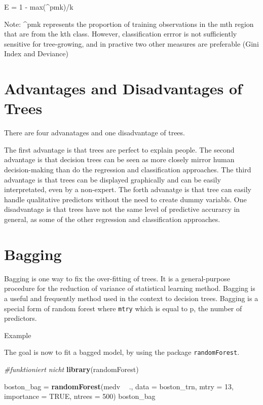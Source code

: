 \documentclass[]{report}
\newenvironment{Shaded}{\begin{snugshade}}{\end{snugshade}}
\newcommand{\KeywordTok}[1]{\textcolor[rgb]{0.13,0.29,0.53}{\textbf{#1}}}
\newcommand{\DataTypeTok}[1]{\textcolor[rgb]{0.13,0.29,0.53}{#1}}
\newcommand{\DecValTok}[1]{\textcolor[rgb]{0.00,0.00,0.81}{#1}}
\newcommand{\StringTok}[1]{\textcolor[rgb]{0.31,0.60,0.02}{#1}}
\newcommand{\CommentTok}[1]{\textcolor[rgb]{0.56,0.35,0.01}{\textit{#1}}}
\newcommand{\OtherTok}[1]{\textcolor[rgb]{0.56,0.35,0.01}{#1}}
\newcommand{\OperatorTok}[1]{\textcolor[rgb]{0.81,0.36,0.00}{\textbf{#1}}}
\newcommand{\NormalTok}[1]{#1}
\begin{document}
E = 1 - max(\^{}pmk)/k

Note: \^{}pmk represents the proportion of training observations in the
mth region that are from the kth class. However, classification errror
is not sufficiently sensitive for tree-growing, and in practive two
other measures are preferable (Gini Index and Deviance)

\section{Advantages and Disadvantages of
Trees}\label{advantages-and-disadvantages-of-trees}

There are four advanatages and one disadvantage of trees.

The first advantage is that trees are perfect to explain people. The
second advantage is that decision trees can be seen as more closely
mirror human decision-making than do the regression and classification
approaches. The third advantage is that trees can be displayed
graphically and can be easily interpretated, even by a non-expert. The
forth advanatge is that tree can easily handle qualitative predictors
without the need to create dummy variabls. One disadvantage is that
trees have not the same level of predictive accurarcy in general, as
some of the other regression and classification approaches.

\section{Bagging}\label{bagging}

Bagging is one way to fix the over-fitting of trees. It is a
general-purpose procedure for the reduction of variance of statistical
learning method. Bagging is a useful and frequently method used in the
context to decision trees. Bagging is a special form of random forest
where \texttt{mtry} which is equal to p, the number of predictors.

Example

The goal is now to fit a bagged model, by using the package
\texttt{randomForest}.

\begin{Shaded}
\begin{Highlighting}[]
\CommentTok{#funktioniert nicht}
\KeywordTok{library}\NormalTok{(randomForest)}

\NormalTok{boston_bag =}\StringTok{ }\KeywordTok{randomForest}\NormalTok{(medv }\OperatorTok{~}\StringTok{ }\NormalTok{., }\DataTypeTok{data =}\NormalTok{ boston_trn, }\DataTypeTok{mtry =} \DecValTok{13}\NormalTok{, }
                          \DataTypeTok{importance =} \OtherTok{TRUE}\NormalTok{, }\DataTypeTok{ntrees =} \DecValTok{500}\NormalTok{)}
\NormalTok{boston_bag}
\end{Highlighting}
\end{Shaded}
\end{document}

